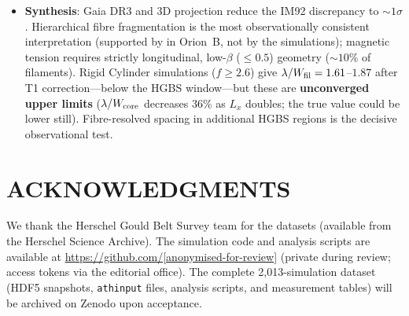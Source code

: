 \documentclass[twoside,twocolumn]{mnras}
\begin{document}
\begin{itemize}
    \item \textbf{Synthesis}: Gaia DR3 and 3D projection reduce the IM92 discrepancy to
    ${\sim}1\sigma$. Hierarchical fibre fragmentation is the most observationally
    consistent interpretation (supported by \citealt{Yang2024} in Orion~B, not by
    the simulations); magnetic tension requires strictly longitudinal, low-$\beta$
    ($\leq0.5$) geometry (${\sim}10\%$ of filaments). Rigid Cylinder simulations ($f \geq 2.6$) give $\lambda/W_{\rm fil} = 1.61$--$1.87$
    after T1 correction---below the HGBS window---but these are \textbf{unconverged
    upper limits} ($\lambda/W_{\rm core}$ decreases 36\% as $L_x$ doubles; the true
    value could be lower still). Fibre-resolved spacing in additional HGBS regions
    is the decisive observational test.

\end{itemize}

\section*{ACKNOWLEDGMENTS}

We thank the Herschel Gould Belt Survey team for the datasets (available from the
Herschel Science Archive). The simulation code and analysis scripts are available at
\url{https://github.com/[anonymised-for-review]} (private during review; access tokens
via the editorial office). The complete 2,013-simulation dataset (HDF5 snapshots,
\texttt{athinput} files, analysis scripts, and measurement tables) will be archived on
Zenodo upon acceptance.



\end{document}
